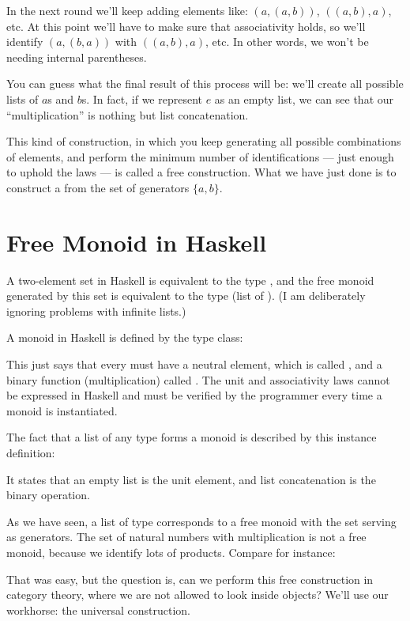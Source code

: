 \noindent
In the next round we'll keep adding elements like:
$(a, (a, b))$, $((a, b), a)$, etc. At this point we'll
have to make sure that associativity holds, so we'll identify
$(a, (b, a))$ with $((a, b), a)$, etc. In other words,
we won't be needing internal parentheses.

You can guess what the final result of this process will be: we'll
create all possible lists of $a$s and $b$s. In fact, if we
represent $e$ as an empty list, we can see that our
``multiplication'' is nothing but list concatenation.

This kind of construction, in which you keep generating all possible
combinations of elements, and perform the minimum number of
identifications --- just enough to uphold the laws --- is called a free
construction. What we have just done is to construct a  from the set of generators $\{a, b\}$.

\section{Free Monoid in Haskell}

A two-element set in Haskell is equivalent to the type ,
and the free monoid generated by this set is equivalent to the type
\code{{[}Bool{]}} (list of ). (I am deliberately ignoring
problems with infinite lists.)

A monoid in Haskell is defined by the type class:

This just says that every  must have a neutral element,
which is called , and a binary function (multiplication)
called . The unit and associativity laws cannot be
expressed in Haskell and must be verified by the programmer every time a
monoid is instantiated.

The fact that a list of any type forms a monoid is described by this
instance definition:

It states that an empty list \code{{[}{]}} is the unit element, and
list concatenation \code{(++)} is the binary operation.

As we have seen, a list of type  corresponds to a free monoid
with the set  serving as generators. The set of natural
numbers with multiplication is not a free monoid, because we identify
lots of products. Compare for instance:

That was easy, but the question is, can we perform this free
construction in category theory, where we are not allowed to look inside
objects? We'll use our workhorse: the universal construction.

